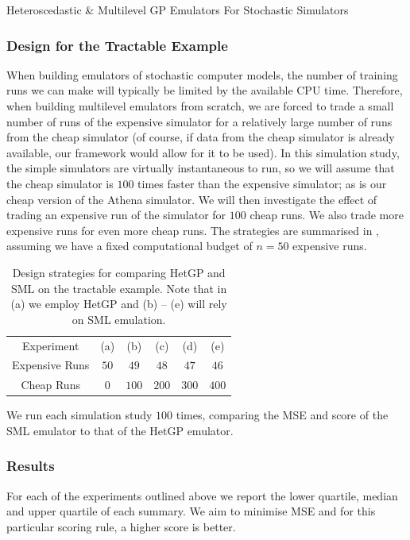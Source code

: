 \begin{chapter}{Heteroscedastic \& Multilevel GP Emulators For Stochastic Simulators\label{Ch:Hetsml}}
\subsubsection{Design for the Tractable Example}

When building emulators of stochastic computer models, the number of training runs we can make will typically be limited by the available CPU time. Therefore, when building multilevel emulators from scratch, we are forced to trade a small number of runs of the expensive simulator for a relatively large number of runs from the cheap simulator (of course, if data from the cheap simulator is already available, our framework would allow for it to be used). In this simulation study, the simple simulators are virtually instantaneous to run, so we will assume that the cheap simulator is $100$ times faster than the expensive simulator; as is our cheap version of the Athena simulator. We will then investigate the effect of trading an expensive run of the simulator for $100$ cheap runs. We also trade more expensive runs for even more cheap runs. The strategies are summarised in , assuming we have a fixed computational budget of $n=50$ expensive runs.
\begin{table}[h]
	\centering
	\begin{tabular}{cccccc}
		\toprule
		Experiment & (a) & (b) & (c) & (d) & (e) \\ \cmidrule{1-6}
		Expensive Runs & $50$ & $49$ & $48$ & $47$ & $46$ \\
		Cheap Runs & $0$ & $100$ & $200$ & $300$ & $400$\\
		\bottomrule
	\end{tabular}
	\caption{Design strategies for comparing HetGP and SML on the tractable example. Note that in (a) we employ HetGP and (b) -- (e) will rely on SML emulation.}
	\label{Table:tractable-experiments}
\end{table}
We run each simulation study $100$ times, comparing the MSE and score of the SML emulator to that of the HetGP emulator.
\subsubsection{Results \label{Sec:tractable-results}}
For each of the experiments outlined above we report the lower quartile, median and upper quartile of each summary. We aim to minimise MSE and for this particular scoring rule, a higher score is better.


\end{chapter}
